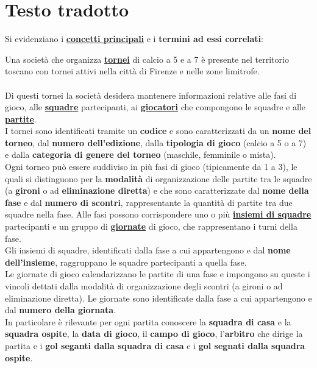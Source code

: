 \documentclass[11pt, openany]{article}
\theoremstyle{definition}
\theoremstyle{plain}
\theoremstyle{remark}
\begin{document}
		\newpage\section{Testo tradotto}
			Si evidenziano i \underline{\textbf{concetti principali}} e i \textbf{termini ad essi correlati}:
			\begin{tcolorbox}[width=\textwidth, colback={Cornsilk2}]
				Una società che organizza \textbf{\underline{tornei}} di calcio a 5 e a 7 è presente nel territorio toscano con tornei attivi nella città di Firenze e nelle zone limitrofe.\\\\
				Di questi tornei la società desidera mantenere informazioni relative alle fasi di gioco, alle \textbf{\underline{squadre}} partecipanti, ai \textbf{\underline{giocatori}} che compongono le squadre e alle \textbf{\underline{partite}}.\\
				I tornei sono identificati tramite un \textbf{codice} e sono caratterizzati da un \textbf{nome del torneo}, dal \textbf{numero dell’edizione}, dalla \textbf{tipologia di gioco} (calcio a 5 o a 7) e dalla \textbf{categoria di genere del torneo} (maschile, femminile o mista).\\
				Ogni torneo può essere suddiviso in più fasi di gioco (tipicamente da 1 a 3), le quali si distinguono per la \textbf{modalità} di organizzazione delle partite tra le squadre (a \textbf{gironi} o ad \textbf{eliminazione diretta}) e che sono caratterizzate dal \textbf{nome della fase} e dal \textbf{numero di scontri}, rappresentante la quantità di partite tra due squadre nella fase. Alle fasi possono corrispondere uno o più \underline{\textbf{insiemi di squadre}} partecipanti e un gruppo di \underline{\textbf{giornate}} di gioco, che rappresentano i turni della fase.\\
				Gli insiemi di squadre, identificati dalla fase a cui appartengono e dal \textbf{nome dell’insieme}, raggruppano le squadre partecipanti a quella fase.\\
				Le giornate di gioco calendarizzano le partite di una fase e impongono su queste i vincoli dettati dalla modalità di organizzazione degli scontri (a gironi o ad eliminazione diretta). Le giornate sono identificate dalla fase a cui appartengono e dal \textbf{numero della giornata}.\\
				In particolare è rilevante per ogni partita conoscere la \textbf{squadra di casa} e la \textbf{squadra ospite}, la \textbf{data di gioco}, il \textbf{campo di gioco}, l’\textbf{arbitro} che dirige la partita e i \textbf{gol seganti dalla squadra di casa} e i \textbf{gol segnati dalla squadra ospite}.\\

\end{tcolorbox}
\end{document}
